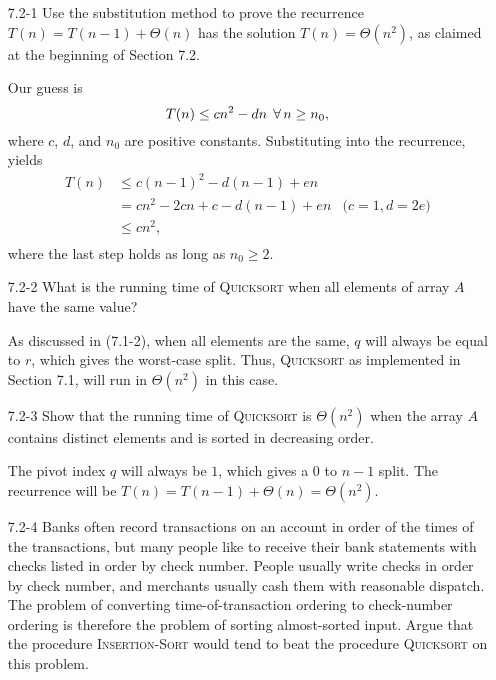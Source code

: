 \begin{enumerate}

\item[7.2{-}1]{Use the substitution method to prove the recurrence
$T(n) = T(n - 1) + \Theta(n)$ has the solution $T(n) = \Theta(n^2)$, as claimed
at the beginning of Section 7.2.}

\begin{framed}
Our guess is
\[
  T(n) \le cn^2 - dn\;\operatorname{\forall} n \ge n_0,
\]
where $c$, $d$, and $n_0$ are positive constants. Substituting into the
recurrence, yields
\begin{equation*}
\begin{aligned}
  T(n) &\le c(n - 1)^2 - d(n - 1) + en\\
       &= cn^2 - 2cn + c -d(n - 1) + en & \text{($c = 1, d = 2e$)}\\
       &\le cn^2,\\
\end{aligned}
\end{equation*}
where the last step holds as long as $n_0 \ge 2$.
\end{framed}

\item[7.2{-}2]{What is the running time of \textsc{Quicksort} when all elements
of array $A$ have the same value?}

\begin{framed}
As discussed in (7.1-2), when all elements are the same, $q$ will always be
equal to $r$, which gives the worst-case split. Thus, \textsc{Quicksort} as
implemented in Section 7.1, will run in $\Theta(n^2)$ in this case.
\end{framed}

\item[7.2{-}3]{Show that the running time of \textsc{Quicksort} is $\Theta(n^2)$
when the array $A$ contains distinct elements and is sorted in decreasing
order.}

\begin{framed}
The pivot index $q$ will always be $1$, which gives a $0$ to $n - 1$ split.
The recurrence will be $T(n) = T(n - 1) + \Theta(n) = \Theta(n^2)$.
\end{framed}

\item[7.2{-}4]{Banks often record transactions on an account in order of the
times of the transactions, but many people like to receive their bank statements
with checks listed in order by check number. People usually write checks in
order by check number, and merchants usually cash them with reasonable dispatch.
The problem of converting time-of-transaction ordering to check-number ordering
is therefore the problem of sorting almost-sorted input. Argue that the
procedure \textsc{Insertion-Sort} would tend to beat the procedure
\textsc{Quicksort} on this problem.}


\end{enumerate}
